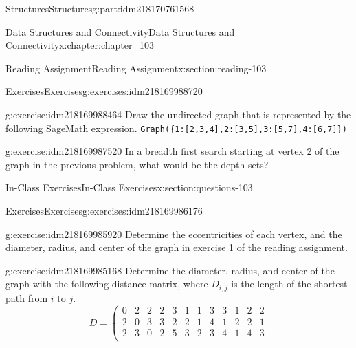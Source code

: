 \documentclass[oneside,10pt,]{book}
\newcommand{\mono}[1]{\texttt{#1}}
\numberwithin{equation}{section}
\begin{document}
\begin{partptx}{Structures}{}{Structures}{}{}{g:part:idm218170761568}
\begin{chapterptx}{Data Structures and Connectivity}{}{Data Structures and Connectivity}{}{}{x:chapter:chapter_103}
\begin{sectionptx}{Reading Assignment}{}{Reading Assignment}{}{}{x:section:reading-103}
\begin{exercises-subsection-numberless}{Exercises}{}{Exercises}{}{}{g:exercises:idm218169988720}
%
\begin{exercisegroup}
\begin{divisionexerciseeg}{1}{}{}{g:exercise:idm218169988464}%
Draw the undirected graph that is represented by the following SageMath expression. \mono{Graph(\{1:[2,3,4],2:[3,5],3:[5,7],4:[6,7]\})}%
\end{divisionexerciseeg}%
\begin{divisionexerciseeg}{2}{}{}{g:exercise:idm218169987520}%
In a breadth first search starting at vertex 2 of the graph in the previous problem, what would be the depth sets?%
\end{divisionexerciseeg}%
\end{exercisegroup}
\par\medskip\noindent
\end{exercises-subsection-numberless}
\end{sectionptx}
%
%
\typeout{************************************************}
\typeout{************************************************}
%
\begin{sectionptx}{In-Class Exercises}{}{In-Class Exercises}{}{}{x:section:questions-103}
%
%
%
\typeout{************************************************}
\typeout{************************************************}
%
\begin{exercises-subsection-numberless}{Exercises}{}{Exercises}{}{}{g:exercises:idm218169986176}
\par\medskip\noindent%
%
\begin{exercisegroup}
\begin{divisionexerciseeg}{1}{}{}{g:exercise:idm218169985920}%
Determine the eccentricities of each vertex, and the diameter, radius, and center of the graph in exercise 1 of the reading assignment.%
\end{divisionexerciseeg}%
\begin{divisionexerciseeg}{2}{}{}{g:exercise:idm218169985168}%
Determine the diameter, radius, and center of the graph with the following distance matrix, where \(D_{i,j}\) is the length of the shortest path from \(i\) to \(j\).%
\begin{equation*}
D=\left(
\begin{array}{cccccccccccc}
0 & 2 & 2 & 2 & 3 & 1 & 1 & 3 & 3 & 1 & 2 & 2 \\
2 & 0 & 3 & 3 & 2 & 2 & 1 & 4 & 1 & 2 & 2 & 1 \\
2 & 3 & 0 & 2 & 5 & 3 & 2 & 3 & 4 & 1 & 4 & 3 \\

\end{array}
\end{equation*}
\end{divisionexerciseeg}
\end{exercisegroup}
\end{exercises-subsection-numberless}
\end{sectionptx}
\end{chapterptx}
\end{partptx}
\end{document}
